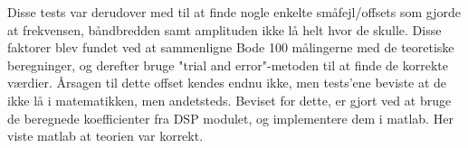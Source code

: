 Disse tests var derudover med til at finde nogle enkelte småfejl/offsets som gjorde at frekvensen, båndbredden samt amplituden ikke lå helt hvor de skulle. Disse faktorer blev fundet ved at sammenligne Bode 100 målingerne med de teoretiske beregninger, og derefter bruge "trial and error"-metoden til at finde de korrekte værdier. Årsagen til dette offset kendes endnu ikke, men tests'ene beviste at de ikke lå i matematikken, men andetsteds. 
Beviset for dette, er gjort ved at bruge de beregnede koefficienter fra DSP modulet, og implementere dem i matlab. 
Her viste matlab at teorien var korrekt. 













